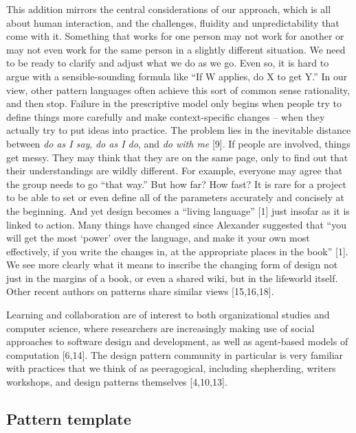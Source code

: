 This addition mirrors the central considerations of our approach, which
is all about human interaction, and the challenges, fluidity and
unpredictability that come with it. Something that works for one person
may not work for another or may not even work for the same person in a
slightly different situation. We need to be ready to clarify and adjust
what we do as we go. Even so, it is hard to argue with a
sensible-sounding formula like ``If W applies, do X to get Y.'' In our
view, other pattern languages often achieve this sort of common sense
rationality, and then stop. Failure in the prescriptive model only
begins when people try to define things more carefully and make
context-specific changes -- when they actually try to put ideas into
practice. The problem lies in the inevitable distance between \emph{do
as I say}, \emph{do as I do}, and \emph{do with me} {{[}9{]}}. If people
are involved, things get messy. They may think that they are on the same
page, only to find out that their understandings are wildly different.
For example, everyone may agree that the group needs to go ``that way.''
But how far? How fast? It is rare for a project to be able to set or
even define all of the parameters accurately and concisely at the
beginning. And yet design becomes a ``living language'' {{[}1{]}} just
insofar as it is linked to action. Many things have changed since
Alexander suggested that ``you will get the most `power' over the
language, and make it your own most effectively, if you write the
changes in, at the appropriate places in the book'' {{[}1{]}}. We see
more clearly what it means to inscribe the changing form of design not
just in the margins of a book, or even a shared wiki, but in the
lifeworld itself. Other recent authors on patterns share similar views
{{[}15,16,18{]}}.

Learning and collaboration are of interest to both organizational
studies and computer science, where researchers are increasingly making
use of social approaches to software design and development, as well as
agent-based models of computation {{[}6,14{]}}. The design pattern
community in particular is very familiar with practices that we think of
as peeragogical, including shepherding, writers workshops, and design
patterns themselves {{[}4,10,13{]}}.

\hypertarget{pattern-template}{%
\subsection{Pattern template}\label{pattern-template}}

